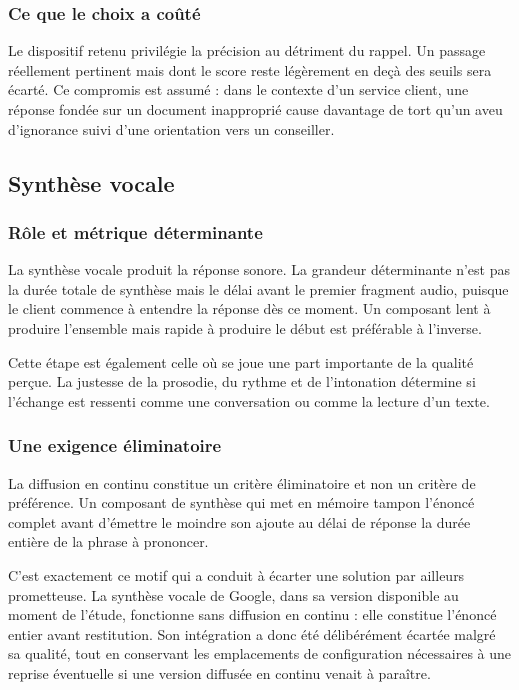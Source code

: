 \subsubsection{Ce que le choix a coûté}

Le dispositif retenu privilégie la précision au détriment du rappel. Un passage réellement pertinent mais dont le score reste légèrement en deçà des seuils sera écarté. Ce compromis est assumé : dans le contexte d'un service client, une réponse fondée sur un document inapproprié cause davantage de tort qu'un aveu d'ignorance suivi d'une orientation vers un conseiller.

\subsection{Synthèse vocale}

\subsubsection{Rôle et métrique déterminante}

La synthèse vocale produit la réponse sonore. La grandeur déterminante n'est pas la durée totale de synthèse mais le délai avant le premier fragment audio, puisque le client commence à entendre la réponse dès ce moment. Un composant lent à produire l'ensemble mais rapide à produire le début est préférable à l'inverse.

Cette étape est également celle où se joue une part importante de la qualité perçue. La justesse de la prosodie, du rythme et de l'intonation détermine si l'échange est ressenti comme une conversation ou comme la lecture d'un texte.

\subsubsection{Une exigence éliminatoire}

La diffusion en continu constitue un critère éliminatoire et non un critère de préférence. Un composant de synthèse qui met en mémoire tampon l'énoncé complet avant d'émettre le moindre son ajoute au délai de réponse la durée entière de la phrase à prononcer.

C'est exactement ce motif qui a conduit à écarter une solution par ailleurs prometteuse. La synthèse vocale de Google, dans sa version disponible au moment de l'étude, fonctionne sans diffusion en continu : elle constitue l'énoncé entier avant restitution. Son intégration a donc été délibérément écartée malgré sa qualité, tout en conservant les emplacements de configuration nécessaires à une reprise éventuelle si une version diffusée en continu venait à paraître.

